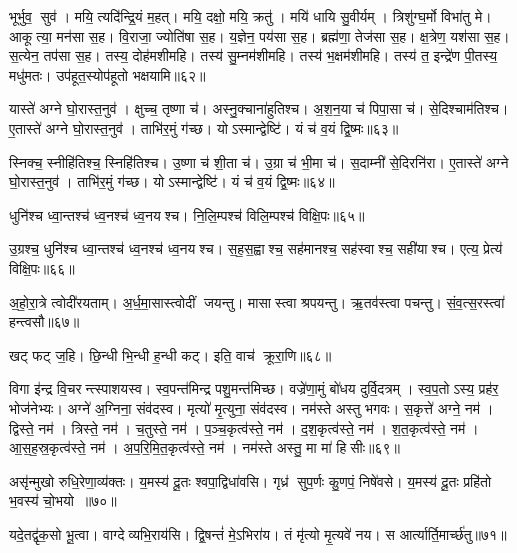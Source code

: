 भूर्भुव॒ सुव॑। 
मयि॒ त्यदि॑न्द्रि॒यं म॒हत्। 
मयि॒ दक्षो॒ मयि॒ क्रतु॑। 
मयि॑ धायि सु॒वीर्यम्। 
त्रिशु॑ग्घ॒र्मो विभा॑तु मे। 
आकूत्या॒ मन॑सा स॒ह। 
वि॒राजा॒ ज्योति॑षा स॒ह। 
य॒ज्ञेन॒ पय॑सा स॒ह। 
ब्रह्म॑णा॒ तेज॑सा स॒ह। 
क्ष॒त्रेण॒ यश॑सा स॒ह। 
स॒त्येन॒ तप॑सा स॒ह। 
तस्य॒ दोह॑मशीमहि। 
तस्य॑ सु॒म्नम॑शीमहि। 
तस्य॑ भ॒क्षम॑शीमहि। 
तस्य॑ त॒ इन्द्रे॑ण पी॒तस्य॒ मधु॑मतः। 
उप॑हूत॒स्योप॑हूतो भक्षयामि॥६२॥
\anuvakamend[यश॑सा स॒ह षट्च॑]

यास्ते॑ अग्ने घो॒रास्त॒नुव॑। 
क्षुच्च॒ तृष्णा च॑। 
अस्नु॒क्चाना॑हुतिश्च। 
अ॒श॒न॒या च॑ पिपा॒सा च॑। 
से॒दिश्चाम॑तिश्च। 
ए॒तास्ते॑ अग्ने घो॒रास्त॒नुव॑। 
ताभि॑र॒मुं ग॑च्छ। 
योऽस्मान्द्वेष्टि॑। 
यं च॑ व॒यं द्वि॒ष्मः॥६३॥
\anuvakamend

स्निक्च॒ स्नीहि॑तिश्च॒ स्निहि॑तिश्च। 
उ॒ष्णा च॑ शी॒ता च॑। 
उ॒ग्रा च॑ भी॒मा च॑। 
स॒दाम्नी॑ से॒दिरनि॑रा। 
ए॒तास्ते॑ अग्ने घो॒रास्त॒नुव॑। 
ताभि॑र॒मुं ग॑च्छ। 
योऽस्मान्द्वेष्टि॑। 
यं च॑ व॒यं द्वि॒ष्मः॥६४॥
\anuvakamend

धुनि॑श्च ध्वा॒न्तश्च॑ ध्व॒नश्च॑ ध्व॒नयश्च। 
नि॒लि॒म्पश्च॑ विलि॒म्पश्च॑ विक्षि॒पः॥६५॥
\anuvakamend

उ॒ग्रश्च॒ धुनि॑श्च ध्वा॒न्तश्च॑ ध्व॒नश्च॑ ध्व॒नयश्च। 
स॒ह॒स॒ह्वाश्च॒ सह॑मानश्च॒ सह॑स्वाश्च॒ सही॑याश्च। 
एत्य॒ प्रेत्य॑ विक्षि॒पः॥६६॥
\anuvakamend


अ॒हो॒रा॒त्रे त्वोदी॑रयताम्। 
अ॒र्ध॒मा॒सास्त्वोदीं जयन्तु। 
मासास्त्वा श्रपयन्तु। 
ऋ॒तव॑स्त्वा पचन्तु। 
सं॒व॒त्स॒रस्त्वा॑ हन्त्वसौ॥६७॥
\anuvakamend

खट् फट् ज॒हि। 
छि॒न्धी भि॒न्धी ह॒न्धी कट्। 
इति॒ वाच॑ क्रूरा॒णि॥६८॥
\anuvakamend

विगा इ॑न्द्र वि॒चरन्त्स्पाशयस्व। 
स्व॒पन्त॑मिन्द्र पशु॒मन्त॑मिच्छ। 
वज्रे॑णा॒मुं बो॑धय दुर्वि॒दत्रम्। 
स्व॒प॒तोऽस्य॒ प्रह॑र॒ भोज॑नेभ्यः। 
अग्ने॑ अ॒ग्निना॒ संव॑दस्व। 
मृत्यो॑ मृ॒त्युना॒ संव॑दस्व। 
नम॑स्ते अस्तु भगवः। 
स॒कृत्ते॑ अग्ने॒ नम॑। 
द्विस्ते॒ नम॑। 
त्रिस्ते॒ नम॑। 
च॒तुस्ते॒ नम॑। 
प॒ञ्च॒कृत्व॑स्ते॒ नम॑। 
द॒श॒कृत्व॑स्ते॒ नम॑। 
श॒त॒कृत्व॑स्ते॒ नम॑। 
आ॒स॒ह॒स्र॒कृत्व॑स्ते॒ नम॑। 
अ॒प॒रि॒मि॒त॒कृत्व॑स्ते॒ नम॑। 
नम॑स्ते अस्तु॒ मा मा॑ हिसीः॥६९॥
\anuvakamend[त्रिस्ते॒ नम॑ स॒प्त च॑]

असृ॑न्मुखो रुधि॒रेणा॒व्य॑क्तः। 
य॒मस्य॑ दू॒तः  श्वपा॒द्विधा॑वसि। 
गृध्र॑ सुप॒र्णः कु॒णपं॒ निषे॑वसे। 
य॒मस्य॑ दू॒तः प्रहि॑तो भ॒वस्य॑ चो॒भयो॥७०॥
\anuvakamend

यदे॒तद्वृ॑क॒सो भू॒त्वा। 
वाग्देव्यभि॒राय॑सि। 
द्वि॒षन्तं॑ मे॒ऽभिरा॑य। 
तं मृ॑त्यो मृ॒त्यवे॑ नय। 
स आर्त्यार्ति॒मार्च्छ॑तु॥७१॥
\anuvakamend

